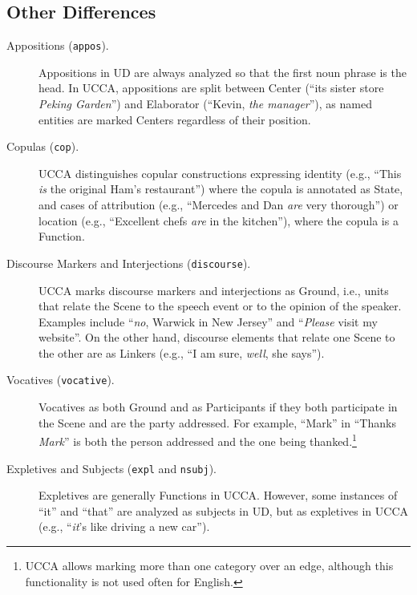 \documentclass[11pt,a4paper]{article}
\newcommand{\oa}[1]{\footnote{\color{red}OA: #1}}
\begin{document}
    

\subsection{Other Differences}\label{sec:misc}

\begin{description}

    \item[Appositions (\texttt{appos}).]
    Appositions in UD are always analyzed so that the first
    noun phrase is the head. 
    In UCCA, appositions are split between Center
    (``its sister store \textit{Peking Garden}'')
    and Elaborator (``Kevin, \textit{the manager}''),
    as named entities are marked Centers regardless of their position.

    \item[Copulas (\texttt{cop}).]
    UCCA distinguishes copular constructions expressing
    identity (e.g., ``This \textit{is} the original Ham's restaurant'') where the copula is annotated as State,
    and cases of attribution 
    (e.g., ``Mercedes and Dan \textit{are} very thorough'')
    or location (e.g., ``Excellent chefs \textit{are} in the kitchen''),
    where the copula is a Function.
    

    \item[Discourse Markers and Interjections (\texttt{discourse}).] 
    UCCA marks discourse markers and interjections as Ground, i.e., units that relate the Scene 
    to the speech event or to the opinion of the speaker. Examples include ``\textit{no}, Warwick in New Jersey'' and ``\textit{Please} visit my website''.
    On the other hand, discourse elements that relate one Scene to the other 
    are as Linkers (e.g., ``I am sure, \textit{well}, she says'').

    \item[Vocatives (\texttt{vocative}).]
    Vocatives as both Ground and as Participants if they both participate in the Scene and are the party addressed.
    For example, ``Mark'' in ``Thanks \textit{Mark}'' is both the person addressed and the one 
    being thanked.\footnote{UCCA allows marking more than one category over an edge, although this
    functionality is not used often for English.}

    
    
    
    \item[Expletives and Subjects (\texttt{expl} and \texttt{nsubj}).]
    Expletives are generally Functions in UCCA.
    However, some instances of ``it'' and ``that'' are analyzed as subjects in UD,
    but as expletives in UCCA (e.g., ``\textit{it}'s like driving a new car'').    


\end{description}
\end{document}
